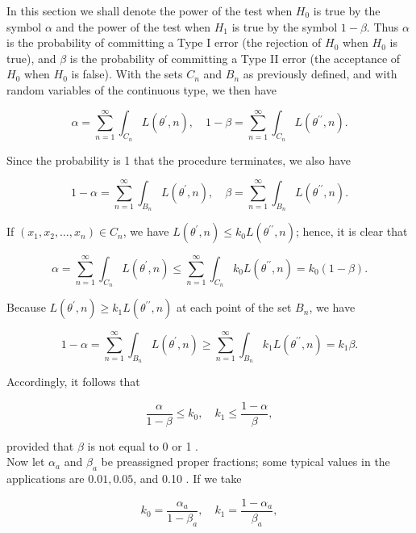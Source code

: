 In this section we shall denote the power of the test when $H_{0}$ is true by the symbol $\alpha$ and the power of the test when $H_{1}$ is true by the symbol $1-\beta$. Thus $\alpha$ is the probability of committing a Type I error (the rejection of $H_{0}$ when $H_{0}$ is true), and $\beta$ is the probability of committing a Type II error (the acceptance of $H_{0}$ when $H_{0}$ is false). With the sets $C_{n}$ and $B_{n}$ as previously defined, and with random variables of the continuous type, we then have

$$
\alpha=\sum_{n=1}^{\infty} \int_{C_{n}} L\left(\theta^{\prime}, n\right), \quad 1-\beta=\sum_{n=1}^{\infty} \int_{C_{n}} L\left(\theta^{\prime \prime}, n\right) .
$$

Since the probability is 1 that the procedure terminates, we also have

$$
1-\alpha=\sum_{n=1}^{\infty} \int_{B_{n}} L\left(\theta^{\prime}, n\right), \quad \beta=\sum_{n=1}^{\infty} \int_{B_{n}} L\left(\theta^{\prime \prime}, n\right) .
$$

If $\left(x_{1}, x_{2}, \ldots, x_{n}\right) \in C_{n}$, we have $L\left(\theta^{\prime}, n\right) \leq k_{0} L\left(\theta^{\prime \prime}, n\right)$; hence, it is clear that

$$
\alpha=\sum_{n=1}^{\infty} \int_{C_{n}} L\left(\theta^{\prime}, n\right) \leq \sum_{n=1}^{\infty} \int_{C_{n}} k_{0} L\left(\theta^{\prime \prime}, n\right)=k_{0}(1-\beta) .
$$

Because $L\left(\theta^{\prime}, n\right) \geq k_{1} L\left(\theta^{\prime \prime}, n\right)$ at each point of the set $B_{n}$, we have

$$
1-\alpha=\sum_{n=1}^{\infty} \int_{B_{n}} L\left(\theta^{\prime}, n\right) \geq \sum_{n=1}^{\infty} \int_{B_{n}} k_{1} L\left(\theta^{\prime \prime}, n\right)=k_{1} \beta .
$$

Accordingly, it follows that


\begin{equation*}
\frac{\alpha}{1-\beta} \leq k_{0}, \quad k_{1} \leq \frac{1-\alpha}{\beta}, \tag{8.4.5}
\end{equation*}


provided that $\beta$ is not equal to 0 or 1 .\\
Now let $\alpha_{a}$ and $\beta_{a}$ be preassigned proper fractions; some typical values in the applications are $0.01,0.05$, and 0.10 . If we take

$$
k_{0}=\frac{\alpha_{a}}{1-\beta_{a}}, \quad k_{1}=\frac{1-\alpha_{a}}{\beta_{a}},
$$


